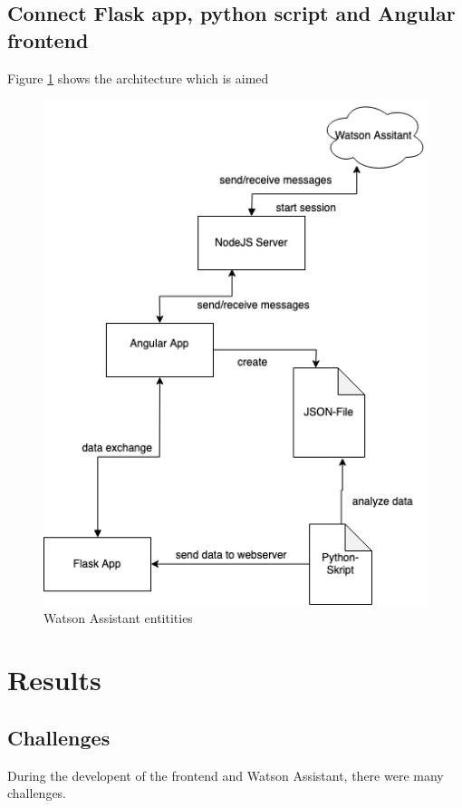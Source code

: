 \subsection{Connect Flask app, python script and Angular frontend}

Figure \ref{architecture_perfect} shows the architecture which is aimed  

\begin{figure}[h]
	\centering
	\includegraphics[width=1\textwidth]{images/architecture_perfectworld.png}
	\caption{Watson Assistant entitities}
	\label{architecture_perfect}
\end{figure}

\section{Results}

\subsection{Challenges}
During the developent of the frontend and Watson Assistant, there were many challenges. 

